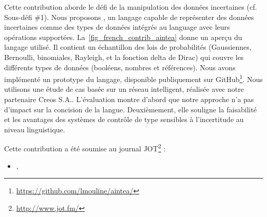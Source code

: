 %
Cette contribution aborde le défi de la manipulation des données incertaines (cf. Sous-défi \#1). 
Nous proposons \langName{}, un langage capable de représenter des données incertaines comme des types de données intégrés au language avec leurs opérations supportées. 
La~\cref{fig_french_contrib_aintea} donne un aperçu du langage utilisé. 
Il contient un échantillon des lois de probabilités (Gaussiennes, Bernoulli, binomiales, Rayleigh, et la fonction delta de Dirac) qui couvre les différents types de données (booléens, nombres et références). 
Nous avons implémenté un prototype du langage, disponible publiquement sur GitHub\footnote{\url{https://github.com/lmouline/aintea/}}. 
Nous utilisons une étude de cas basée sur un réseau intelligent, réalisée avec notre partenaire Creos S.A.. 
L'évaluation montre d'abord que notre approche n'a pas d'impact sur la concision de la langue. 
Deuxièmement, elle souligne la faisabilité et les avantages des systèmes de contrôle de type sensibles à l'incertitude au niveau linguistique.

%
Cette contribution a été soumise au journal JOT\footnote{\url{http://www.jot.fm/}} :
\begin{itemize}
	\item {}, \citeauthor{insubmission:2019:comlan:datauncertainty}
\end{itemize}

